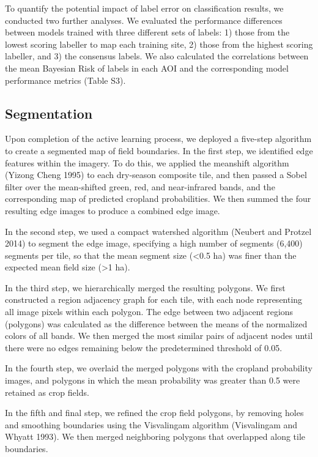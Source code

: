 \documentclass[11pt,a4paper]{article}
\begin{document}
To quantify the potential impact of label error on classification
results, we conducted two further analyses. We evaluated the performance
differences between models trained with three different sets of labels:
1) those from the lowest scoring labeller to map each training site, 2)
those from the highest scoring labeller, and 3) the consensus labels. We
also calculated the correlations between the mean Bayesian Risk of
labels in each AOI and the corresponding model performance metrics
(Table S3).

\hypertarget{segmentation}{%
\subsection{Segmentation}\label{segmentation}}

Upon completion of the active learning process, we deployed a five-step
algorithm to create a segmented map of field boundaries. In the first
step, we identified edge features within the imagery. To do this, we
applied the meanshift algorithm (Yizong Cheng 1995) to each dry-season
composite tile, and then passed a Sobel filter over the mean-shifted
green, red, and near-infrared bands, and the corresponding map of
predicted cropland probabilities. We then summed the four resulting edge
images to produce a combined edge image.

In the second step, we used a compact watershed algorithm (Neubert and
Protzel 2014) to segment the edge image, specifying a high number of
segments (6,400) segments per tile, so that the mean segment size
(\textless0.5 ha) was finer than the expected mean field size
(\textgreater1 ha).

In the third step, we hierarchically merged the resulting polygons. We
first constructed a region adjacency graph for each tile, with each node
representing all image pixels within each polygon. The edge between two
adjacent regions (polygons) was calculated as the difference between the
means of the normalized colors of all bands. We then merged the most
similar pairs of adjacent nodes until there were no edges remaining
below the predetermined threshold of 0.05.

In the fourth step, we overlaid the merged polygons with the cropland
probability images, and polygons in which the mean probability was
greater than 0.5 were retained as crop fields.

In the fifth and final step, we refined the crop field polygons, by
removing holes and smoothing boundaries using the Visvalingam algorithm
(Visvalingam and Whyatt 1993). We then merged neighboring polygons that
overlapped along tile boundaries.
\end{document}
